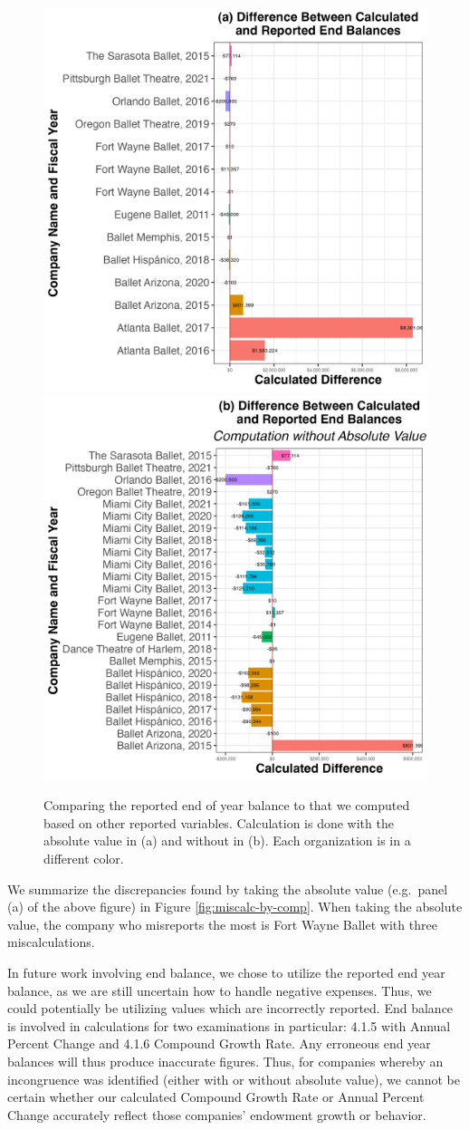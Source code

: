 \documentclass[Dance Data
Project,article,submit,moreauthors,pdftex]{mdpi}
\begin{document}
\begin{figure}[H]
\includegraphics[width=0.5\linewidth,]{../images/diff_end_bal} \includegraphics[width=0.5\linewidth,]{../images/diff_end_bal_no_abs} \caption{\label{fig:miscalc}Comparing the reported end of year balance to that we computed based on other reported variables. Calculation is done with the absolute value in (a) and without in (b). Each organization is in a different color.}\label{fig:unnamed-chunk-5}
\end{figure}

We summarize the discrepancies found by taking the absolute value
(e.g.~panel (a) of the above figure) in Figure
\ref{fig:miscalc-by-comp}. When taking the absolute value, the company
who misreports the most is Fort Wayne Ballet with three miscalculations.

In future work involving end balance, we chose to utilize the reported
end year balance, as we are still uncertain how to handle negative
expenses. Thus, we could potentially be utilizing values which are
incorrectly reported. End balance is involved in calculations for two
examinations in particular: 4.1.5 with Annual Percent Change and 4.1.6
Compound Growth Rate. Any erroneous end year balances will thus produce
inaccurate figures. Thus, for companies whereby an incongruence was
identified (either with or without absolute value), we cannot be certain
whether our calculated Compound Growth Rate or Annual Percent Change
accurately reflect those companies' endowment growth or behavior.
\end{document}
